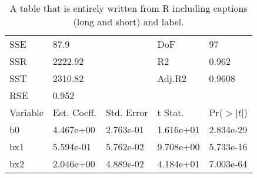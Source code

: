 \begin{table}[h!]
\caption[OLS table all from R]{A table that is entirely written from R including captions (long and short) and label.}\label{ols2}\begin{center}
\begin{tabular}{l l l l l}

\hline
SSE	&	87.9	&		&	DoF	&	97\\ 
SSR	&	2222.92	&		&	R2	&	0.962\\ 
SST	&	2310.82	&		&	Adj.R2	&	0.9608\\ 
RSE	&	0.952	&		&		&	\\ 
\hline
Variable	&	Est. Coeff.	&	Std. Error	&	t Stat.	&	Pr($>|t|$)\\ 
\hline
b0	&	4.467e+00	&	2.763e-01	&	1.616e+01	&	2.834e-29\\ 
bx1	&	5.594e-01	&	5.762e-02	&	9.708e+00	&	5.733e-16\\ 
bx2	&	2.046e+00	&	4.889e-02	&	4.184e+01	&	7.003e-64\\ 
\hline\end{tabular}
\end{center}
\end{table}